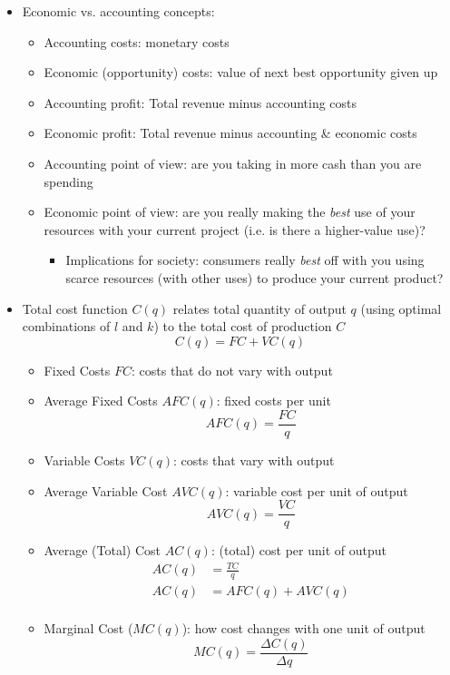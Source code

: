 \documentclass{article}
\begin{document}
\begin{itemize}
	\item Economic vs. accounting concepts: 
	\begin{itemize}
		\item Accounting costs: monetary costs
		\item Economic (opportunity) costs: value of next best opportunity given up 
		\item Accounting profit: Total revenue minus accounting costs
		\item Economic profit: Total revenue minus accounting \& economic costs
		\item Accounting point of view: are you taking in more cash than you are spending
		\item Economic point of view: are you really making the \emph{best} use of your resources with your current project (i.e. is there a higher-value use)? 
		\begin{itemize}
			\item Implications for society: consumers really \emph{best} off with you using scarce resources (with other uses) to produce your current product?
		\end{itemize} 	
	\end{itemize}
	\item Total cost function $C(q)$ relates total quantity of output $q$ (using optimal combinations of $l$ and $k$) to the total cost of production $C$
	\begin{equation*}
	C(q)=FC+VC(q)	
	\end{equation*}
	\begin{itemize}
		\item Fixed Costs $FC$: costs that do not vary with output
		\item Average Fixed Costs $AFC(q)$: fixed costs per unit 
		\begin{equation*}
		AFC(q)=\frac{FC}{q}	
		\end{equation*}
		\item Variable Costs $VC(q)$: costs that vary with output
		\item Average Variable Cost $AVC(q)$: variable cost per unit of output 
		\begin{equation*}
		AVC(q)=\frac{VC}{q}	
		\end{equation*}
		\item Average (Total) Cost $AC(q)$: (total) cost per unit of output 
		\begin{align*}
		AC(q)&=\frac{TC}{q}\\
		AC(q)&=AFC(q)+AVC(q)\\	
		\end{align*}
		\item Marginal Cost ($MC(q)$): how cost changes with one unit of output 
		\begin{equation*}
		MC(q)=\frac{\Delta C(q)}{\Delta q}	
		\end{equation*}
		

\end{itemize}
\end{itemize}
\end{document}

